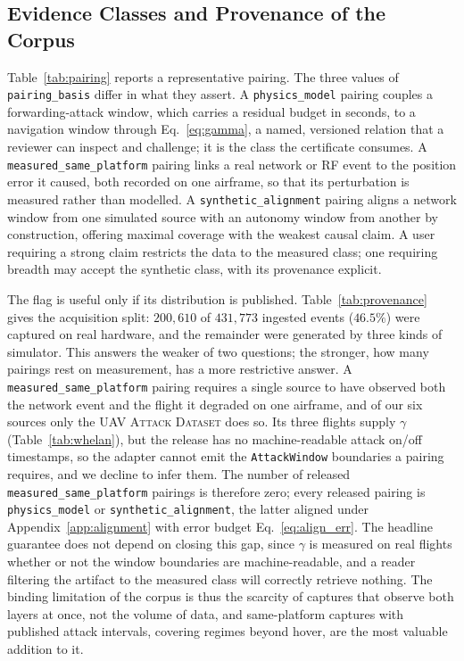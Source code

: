 \documentclass[conference,letterpaper,10pt]{IEEEtran}   %
\newcommand{\dataset}[1]{\textsc{#1}}
\newcommand{\code}[1]{\texttt{#1}}
\begin{document}
\subsection{Evidence Classes and Provenance of the Corpus}
\label{sec:provenance_dist}
Table~\ref{tab:pairing} reports a representative pairing. The three values of
\code{pairing\_basis} differ in what they assert. A \code{physics\_model}
pairing couples a forwarding-attack window, which carries a residual budget in
seconds, to a navigation window through Eq.~\eqref{eq:gamma}, a named,
versioned relation that a reviewer can inspect and challenge; it is the class
the certificate consumes. A \code{measured\_same\_platform} pairing links a real
network or RF event to the position error it caused, both recorded on one
airframe, so that its perturbation is measured rather than modelled. A
\code{synthetic\_alignment} pairing aligns a network window from one simulated
source with an autonomy window from another by construction, offering maximal
coverage with the weakest causal claim. A user requiring a strong claim
restricts the data to the measured class; one requiring breadth may accept the
synthetic class, with its provenance explicit.

The flag is useful only if its distribution is published.
Table~\ref{tab:provenance} gives the acquisition split: $200{,}610$ of
$431{,}773$ ingested events ($46.5\%$) were captured on real hardware, and the
remainder were generated by three kinds of simulator. This answers the weaker
of two questions; the stronger, how many pairings rest on measurement, has a
more restrictive answer. A \code{measured\_same\_platform} pairing requires a
single source to have observed both the network event and the flight it
degraded on one airframe, and of our six sources only the
\dataset{UAV Attack Dataset} does so. Its
three flights supply $\gamma$ (Table~\ref{tab:whelan}), but the release has no
machine-readable attack on/off timestamps, so the adapter cannot emit the
\code{AttackWindow} boundaries a pairing requires, and we decline to infer
them. The number of released \code{measured\_same\_platform} pairings is
therefore zero; every released pairing is \code{physics\_model} or
\code{synthetic\_alignment}, the latter aligned under
Appendix~\ref{app:alignment} with error budget Eq.~\eqref{eq:align_err}. The
headline guarantee does not depend on closing this gap, since $\gamma$ is
measured on real flights whether or not the window boundaries are
machine-readable, and a reader filtering the artifact to the measured class will
correctly retrieve nothing. The binding limitation of the corpus is thus the
scarcity of captures that observe both layers at once, not the volume of data,
and same-platform captures with published attack intervals, covering regimes
beyond hover, are the most valuable addition to it.
\end{document}

